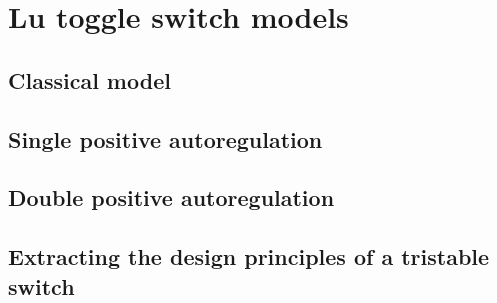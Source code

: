 \section{Lu toggle switch models}
 
\subsection{Classical model}
\subsection{Single positive autoregulation}
\subsection{Double positive autoregulation}
\subsection{Extracting the design principles of a tristable switch}
